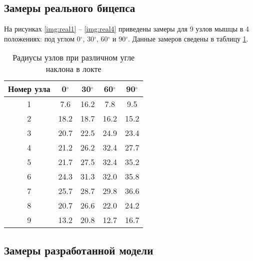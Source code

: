 \clearpage
{}

\subsection{Замеры реального бицепса}

На рисунках \ref{img:real1} -- \ref{img:real4} приведены замеры для 9 узлов мышцы в 4 положениях: под углом 0$^\circ$, 30$^\circ$, 60$^\circ$ и 90$^\circ$. Данные замеров сведены в таблицу \ref{tab:real}.

\clearpage

\begin{table}[!h]
    \begin{center}
        \begin{tabular}{|c|c|c|c|c|}
            \hline
            Номер узла & 0$^\circ$ & 30$^\circ$ & 60$^\circ$ & 90$^\circ$ \\
            \hline
            \hline
            1 & 7.6 & 16.2 & 7.8 & 9.5 \\
            \hline
            2 & 18.2 & 18.7 & 16.2 & 15.2 \\
            \hline
            3 & 20.7 & 22.5 & 24.9 & 23.4 \\
            \hline
            4 & 21.2 & 26.2 & 32.4 & 27.7 \\
            \hline
            5 & 21.7 & 27.5 & 32.4 & 35.2 \\
            \hline
            6 & 24.3 & 31.3 & 32.0 & 35.8 \\
            \hline
            7 & 25.7 & 28.7 & 29.8 & 36.6 \\
            \hline
            8 & 20.7 & 26.6 & 22.0 & 24.2 \\
            \hline
            9 & 13.2 & 20.8 & 12.7 & 16.7 \\
            \hline
        \end{tabular}
    \end{center}
    \caption{\label{tab:real} Радиусы узлов при различном угле наклона в локте}
\end{table}

\subsection{Замеры разработанной модели}

